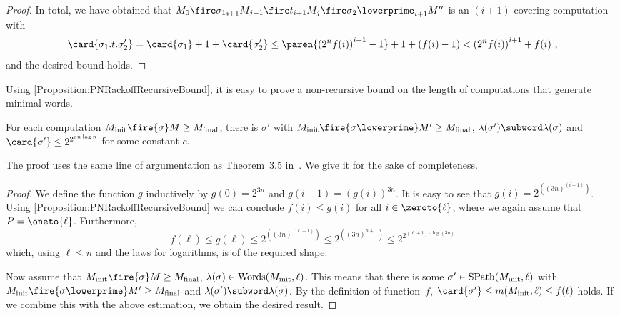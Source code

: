 \documentclass[../../diss.tex]{subfiles}
\begin{document}
\begin{proof}
    In total, we have obtained that $M_0 \fireipo{\sigma_1} M_{j-1} \fireipo{t} M_j \fireipo{\sigma_2\lowerprime} M''$ is an $(i+1)$-covering computation with
    \[
        \card{\sigma_1.t.\sigma_2'}
        = \card{\sigma_1} + 1 + \card{\sigma_2'}
        \leq \paren{ {(2^n f(i))}^{i+1} - 1 } + 1 + (f(i) - 1) <  {(2^n f(i))}^{i+1} + f(i)
        \ ,
    \]
    and the desired bound holds.
\end{proof}

Using \cref{Proposition:PNRackoffRecursiveBound}, it is easy to prove a non-recursive bound on the length of computations that generate minimal words.

\begin{proposition}%
\label{Proposition:PNRackoffNonRecursiveBound}%
  For each computation $\Minit \fire{\sigma} M \geq \Mfinal$, there is $\sigma'$ with $\Minit \fire{\sigma\lowerprime} M' \geq \Mfinal$, $\lambda(\sigma') \subword \lambda(\sigma)$ and $\card{\sigma'} \leq 2^{2^{c n \log n}}$ for some constant $c$.
\end{proposition}

The proof uses the same line of argumentation as Theorem~3.5 in~\cite{Rackoff78}.
We give it for the sake of completeness.

\begin{proof}
    We define the function $g$ inductively by $g(0) = 2^{3n}$ and $g(i + 1) = {(g(i))}^{3n}$.
    It is easy to see that $g(i) = 2^{({(3n)}^{(i+1)})}$.
    Using \cref{Proposition:PNRackoffRecursiveBound} we can conclude $f(i) \leq g(i)$ for all $i \in \zeroto{\ell}$, where we again assume that $P = \oneto{\ell}$.
    Furthermore,
    \[
      f(\ell)
      \leq g(\ell)
      \leq 2^{({(3n)}^{(\ell+1)})}
      \leq 2^{({(3n)}^{n+1})}
      \leq 2^{2^{(\ell + 1) \cdot \log (3n)}}
    \]
    which, using $\ell \leq n$ and the laws for logarithms, is of the required shape.

    Now assume that $\Minit \fire{\sigma} M \geq \Mfinal$, \ie $\lambda(\sigma) \in \text{Words}(M_{\text{init}},\ell)$.
    This means that there is some $\sigma' \in \text{SPath}(M_{\text{init}},\ell)$ with $\Minit \fire{\sigma\lowerprime} M' \geq \Mfinal$ and $\lambda(\sigma') \subword \lambda(\sigma)$.
    By the definition of \mbox{function $f$}, $\card{\sigma'} \leq m(\Minit,\ell) \leq f(\ell)$ holds.
    If we combine this with the above estimation, we obtain the desired result.
\end{proof}
\end{document}
